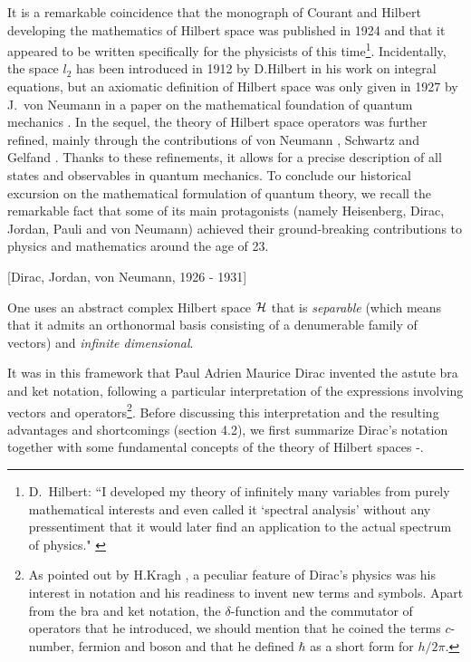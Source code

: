 \documentclass[a4wide,12pt]{report}
\begin{document}
It is a remarkable coincidence that the monograph of Courant and
Hilbert  \cite{ch} developing the mathematics of  Hilbert space was
published in 1924 and that it appeared to be written 
specifically for the physicists of this time\footnote{D.~Hilbert:
``I developed my theory of
infinitely many variables from purely mathematical interests
and even called it `spectral analysis' without any
pressentiment that it would later find an application
to the actual spectrum of physics." \cite{cr}}.
Incidentally, 
the space $l_2$ has been introduced  
in 1912 by D.Hilbert 
in his work on integral equations, but an axiomatic 
definition of Hilbert space was only given in 1927 by 
J.~von Neumann in a paper on the mathematical foundation 
of quantum mechanics \cite{krey}. 
In the sequel, the theory of Hilbert space operators 
was further  refined, mainly through  the
contributions of 
von Neumann \cite{jvn}, Schwartz \cite{ls} and 
Gelfand \cite{gv}. Thanks to these refinements, it allows 
for a precise description of all states and observables in quantum
mechanics. 
To conclude our historical excursion on the mathematical 
formulation of quantum theory, we recall the remarkable fact 
that some of its main protagonists
(namely Heisenberg, Dirac,
Jordan, Pauli  and von Neumann) achieved their  
ground-breaking contributions to physics and mathematics 
around the age of 23. 


\bigskip
 
 [Dirac, Jordan, von Neumann,
1926 - 1931]

\medskip 

One uses an abstract complex Hilbert space ${\cal H}$
 that is {\em separable}
(which means that it admits an orthonormal basis consisting 
of a denumerable family of vectors)
and {\em infinite dimensional}.  

It was in this framework that Paul Adrien Maurice 
Dirac invented the astute
bra and ket notation, following a particular
interpretation of the expressions involving vectors and 
operators\footnote{As pointed out by H.Kragh \cite{kragh}, 
a peculiar feature 
of Dirac's physics was his interest 
in notation and his readiness to invent new terms 
and symbols. 
Apart from the bra and ket notation, the 
$\delta$-function and the commutator of operators 
that he introduced, we should mention that he coined 
the terms $c$-number, fermion and boson 
and that he defined $\hbar$ as a short form 
for $h /2 \pi$.}.    
Before discussing 
this interpretation and the resulting advantages and shortcomings 
(section 4.2), we first  
summarize Dirac's notation together
with some fundamental concepts  
of the theory of Hilbert spaces \cite{ri,sg}\cite{af}-\cite{krey}.
\end{document}
